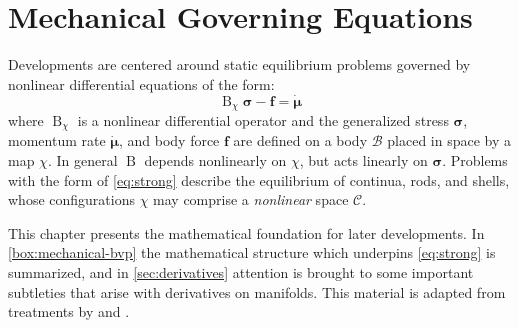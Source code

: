 

%
\section{Mechanical Governing Equations}\label{sec:apparatus}
Developments are centered around static equilibrium problems %
governed by nonlinear differential equations of the form:
\begin{equation}
\operatorname{B}_\chi \bm{\sigma} - \bm{f} = \dot{\bm{\mu}}
\label{eq:strong}
\end{equation}
where \(\operatorname{B}_\chi\) is a nonlinear
differential operator and the generalized stress \(\bm{\sigma}\), momentum rate \(\dot{\bm{\mu}}\), and body force \(\bm{f}\) are defined on a body \(\mathcal{B}\) placed in space by a
map \(\chi\). 
In general \(\operatorname{B}\) depends nonlinearly on \(\chi\),
but acts linearly on \(\bm{\sigma}\). Problems with the form of
\eqref{eq:strong} describe the equilibrium of continua, rods, and shells, whose
configurations \(\chi\) may comprise a \emph{nonlinear} space
\(\mathscr{C}\).

This chapter presents the mathematical foundation for later developments. In
\cref{box:mechanical-bvp} the mathematical structure which underpins
\eqref{eq:strong} is summarized, and in \cref{sec:derivatives} attention
is brought to some important subtleties that arise with derivatives on manifolds. 
This material is adapted from treatments by \cite{marsden1994mathematical,zienkiewicz2014finite,ogden1997nonlinear} and \cite{shilov1996elementary}.

